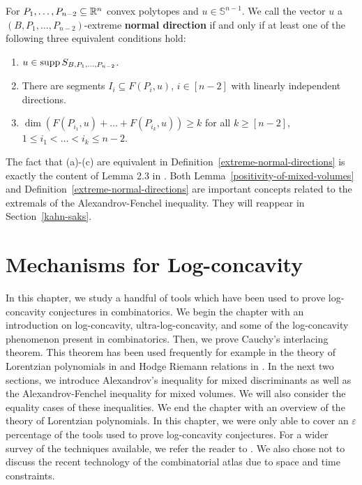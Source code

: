 \documentclass{puthesis-UG}
\begin{document}
\begin{defn} \label{extreme-normal-directions}
	For $P_1, \ldots, P_{n-2} \subseteq \mathbb{R}^n$ convex polytopes and $u \in \mathbb{S}^{n-1}$. We call the vector $u$ a $(B, P_1, \ldots, P_{n-2})$-extreme \textbf{normal direction} if and only if at least one of the following three equivalent conditions hold:
	\begin{enumerate}[label = (\alph*)]
		\item $u \in \operatorname{supp} S_{B, P_1, \ldots, P_{n-2}}$. 
		\item There are segments $I_i \subseteq F (P_i, u)$, $i \in [n-2]$ with linearly independent directions. 
		\item $\dim(F(P_{i_1}, u) + \ldots + F(P_{i_k}, u)) \geq k$ for all $k \geq [n-2]$, $1 \leq i_1 < \ldots < i_k \leq n-2$. 
	\end{enumerate}
\end{defn}

The fact that (a)-(c) are equivalent in Definition~\ref{extreme-normal-directions} is exactly the content of Lemma 2.3 in \cite{shenfeld2022extremals}. Both Lemma~\ref{positivity-of-mixed-volumes} and Definition~\ref{extreme-normal-directions} are important concepts related to the extremals of the Alexandrov-Fenchel inequality. They will reappear in Section~\ref{kahn-saks}.

\chapter{Mechanisms for Log-concavity}
In this chapter, we study a handful of tools which have been used to prove log-concavity conjectures in combinatorics. We begin the chapter with an introduction on log-concavity, ultra-log-concavity, and some of the log-concavity phenomenon present in combinatorics. Then, we prove Cauchy's interlacing theorem. This theorem has been used frequently for example in the theory of Lorentzian polynomials in \cite{lorentzian-polynomials} and Hodge Riemann relations in \cite{MN-gorenstein}. In the next two sections, we introduce Alexandrov's inequality for mixed discriminants as well as the Alexandrov-Fenchel inequality for mixed volumes. We will also consider the equality cases of these inequalities. We end the chapter with an overview of the theory of Lorentzian polynomials. In this chapter, we were only able to cover an $\varepsilon$ percentage of the tools used to prove log-concavity conjectures. For a wider survey of the techniques available, we refer the reader to \cite{Stanley1989LogConcaveAU}. We also chose not to discuss the recent technology of the combinatorial atlas \cite{combinatorial-atlas,logconcave-poset-inequalities} due to space and time constraints. 
\end{document}
